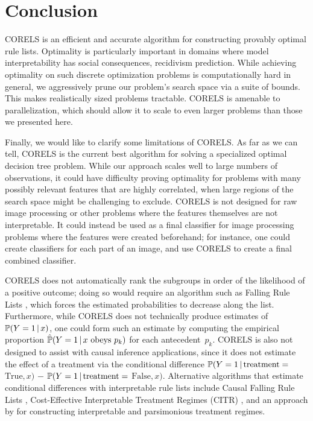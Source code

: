 \section{Conclusion}

CORELS is an efficient and accurate algorithm for constructing provably optimal rule lists.
%
Optimality is particularly important in domains where model interpretability
has social consequences, \eg recidivism prediction.
%
While achieving optimality on such discrete optimization problems is
computationally hard in general, we aggressively prune our problem's search space
via a suite of bounds.
%
This makes realistically sized problems tractable.
%
CORELS is amenable to parallelization, which should allow it to scale to
even larger problems than those we presented here.

\begin{arxiv}
Finally, we would like to clarify some limitations of CORELS.
%
As far as we can tell, CORELS is the current best algorithm for solving a
specialized optimal decision tree problem.
%
While our approach scales well to large numbers of observations,
it could have difficulty proving optimality
for problems with many possibly relevant features that are highly correlated,
when large regions of the search space might be challenging to exclude.
%
CORELS is not designed for raw image processing or other problems where the
features themselves are not interpretable.
%
It could instead be used as a final classifier for image processing problems
where the features were created beforehand; for instance, one could create classifiers
for each part of an image, and use CORELS to create a final combined classifier.

CORELS does not automatically rank the subgroups in order of the likelihood of a
positive outcome; doing so would require an algorithm such as Falling Rule Lists \citep{WangRu15},
which forces the estimated probabilities to decrease along the list.
%
Furthermore, while CORELS does not technically produce estimates of ${\mathbb{P}(Y=1 \,|\, x)}$,
one could form such an estimate by computing the empirical
proportion ${\hat{\mathbb{P}}(Y=1 \,|\, x \textrm{ obeys } p_k)}$ for each antecedent~$p_k$.
%
CORELS is also not designed to assist with causal inference applications, since
it does not estimate the effect of a treatment via the conditional difference
${\mathbb{P}(Y=1 \,|\, \textrm{treatment} =}$ ${\textrm{True}, x)}$ $-$
${\mathbb{P}(Y=1 \,|\, \textrm{treatment} =}$ ${\textrm{False}, x)}$.
%
Alternative algorithms that estimate conditional differences with interpretable
rule lists include Causal Falling Rule Lists \citep{WangRu15CFRL},
Cost-Effective Interpretable Treatment Regimes (CITR) \citep{LakkarajuRu17},
and an approach by \citet{ZhangEtAl15} for constructing
interpretable and parsimonious treatment regimes.


\end{arxiv}
